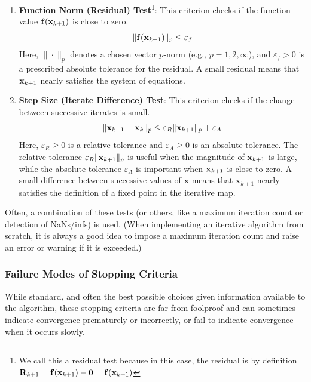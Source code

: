 \begin{enumerate}
    \item \textbf{Function Norm (Residual) Test}\footnote{We call this a residual test because in this case, the residual is by definition $\mathbf{R}_{k+1} = \mathbf{f}(\mathbf{x}_{k+1}) - \mathbf{0} = \mathbf{f}(\mathbf{x}_{k+1})$}: This criterion checks if the function value $\mathbf{f}(\mathbf{x}_{k+1})$ is close to zero.
    \begin{equation}
        \|\mathbf{f}(\mathbf{x}_{k+1})\|_p \le \varepsilon_f
    \end{equation}
    Here, $\|\cdot\|_p$ denotes a chosen vector $p$-norm (e.g., $p=1, 2, \infty$), and $\varepsilon_f > 0$ is a prescribed absolute tolerance for the residual. A small residual means that $\mathbf{x}_{k+1}$ nearly satisfies the system of equations. 

    \item \textbf{Step Size (Iterate Difference) Test}: This criterion checks if the change between successive iterates is small.
    \begin{equation}
        \|\mathbf{x}_{k+1} - \mathbf{x}_k\|_p \le \varepsilon_R \|\mathbf{x}_{k+1}\|_p + \varepsilon_A
    \end{equation}
    Here, $\varepsilon_R \ge 0$ is a relative tolerance and $\varepsilon_A \ge 0$ is an absolute tolerance. The relative tolerance $\varepsilon_R \|\mathbf{x}_{k+1}\|_p$ is useful when the magnitude of $\mathbf{x}_{k+1}$ is large, while the absolute tolerance $\varepsilon_A$ is important when $\mathbf{x}_{k+1}$ is close to zero. A small difference between successive values of $\mathbf x$ means that $\mathbf x_{k+1}$ nearly satisfies the definition of a fixed point in the iterative map.
\end{enumerate}
Often, a combination of these tests (or others, like a maximum iteration count or detection of NaNs/infs) is used. (When implementing an iterative algorithm from scratch, it is always a good idea to impose a maximum iteration count and raise an error or warning if it is exceeded.)

\subsubsection{Failure Modes of Stopping Criteria}
While standard, and often the best possible choices given information available to the algorithm, these stopping criteria are far from foolproof and can sometimes indicate convergence prematurely or incorrectly, or fail to indicate convergence when it occurs slowly.


